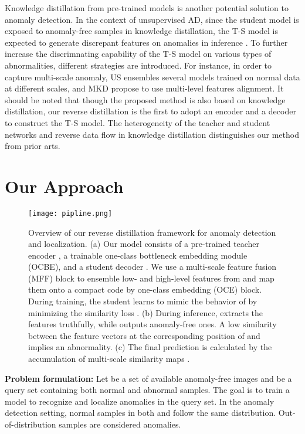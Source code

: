 \documentclass[10pt,twocolumn,letterpaper]{article}
\begin{document}
Knowledge distillation from pre-trained models is another potential solution to anomaly detection. In the context of unsupervised AD, since the student model is exposed to anomaly-free samples in knowledge distillation, the T-S model is expected to generate discrepant features on anomalies in inference \cite{mkd,us,stpm}. To further increase the discrimnating capability of the T-S model on various types of abnormalities, different strategies are introduced. For instance, in order to capture multi-scale anomaly, US \cite{us} ensembles several models trained on normal data at different scales, and MKD \cite{mkd} propose to use multi-level features alignment. 
It should be noted that though the proposed method is also based on knowledge distillation, our reverse distillation is the first to adopt an encoder and a decoder to construct the T-S model. The heterogeneity of the teacher and student networks and reverse data flow in knowledge distillation distinguishes our method from prior arts. \section{Our Approach}
\label{sec:method}


\begin{figure*}[t]
  \centering
   \texttt{[image: pipline.png]}

   \caption{Overview of our reverse distillation framework for anomaly detection and localization. (a) Our model consists of a pre-trained teacher encoder , a trainable one-class bottleneck embedding module (OCBE), and a student decoder . We use a multi-scale feature fusion (MFF) block to ensemble low- and high-level features from  and map them onto a compact code by one-class embedding (OCE) block. During training, the student  learns to mimic the behavior of  by minimizing the similarity loss . (b) During inference,  extracts the features truthfully, while  outputs anomaly-free ones. A low similarity between the feature vectors at the corresponding position of  and  implies an abnormality. (c) The final prediction is calculated by the accumulation of multi-scale similarity maps .}
   \label{fig:pipline}
\end{figure*}

\textbf{Problem formulation:} Let  be a set of available anomaly-free images and  be a query set containing both normal and abnormal samples. The goal is to train a model to recognize and localize anomalies in the query set. In the anomaly detection setting, normal samples in both  and  follow the same distribution. Out-of-distribution samples are considered anomalies.
\end{document}
